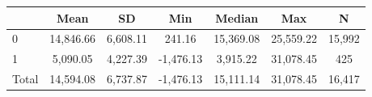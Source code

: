 {
\def\sym#1{\ifmmode^{#1}\else\(^{#1}\)\fi}
\begin{tabular}{l*{1}{cccccc}}
\hline\hline
                    &        Mean&          SD&         Min&      Median&         Max&           N\\
\hline
0                   &   14,846.66&    6,608.11&      241.16&   15,369.08&   25,559.22&      15,992\\
1                   &    5,090.05&    4,227.39&   -1,476.13&    3,915.22&   31,078.45&         425\\
Total               &   14,594.08&    6,737.87&   -1,476.13&   15,111.14&   31,078.45&      16,417\\
\hline\hline
\end{tabular}
}
